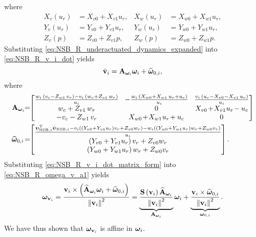 where
\begin{subequations}
    \begin{align}
        X_v(u_r) &= X_{v0} + X_{v1}u_r, &
        X_w(u_r) &= X_{w0} + X_{w1}u_r, \\
        Y_v(u_r) &= Y_{v0} + Y_{v1}u_r, &
        Y_w(u_r) &= Y_{w0} + Y_{w1}u_r, \\
        Z_v(p) &= Z_{v0} + Z_{v1}p, &
        Z_w(p) &= Z_{w0} + Z_{w1}p.
    \end{align}
\end{subequations}
Substituting \eqref{eq:NSB_R_underactuated_dynamics_expanded} into \eqref{eq:NSB_R_v_i_dot} yields
\begin{equation}
    \dot{\mathbf{v}}_i = \mathbf{A}_{\bm{\omega}_i} \bm{\omega}_i + \widehat{\bm{\omega}}_{0, i},
    \label{eq:NSB_R_v_i_dot_matrix_form}
\end{equation}
where
\begin{equation}
    \begin{split}
        \mat{A}_{\bs{\omega}_i\!}\! &=\!\!
        \begin{bmatrix}
            \frac{w_{i}\,\left(v_{c}-Z_{w1}\,v_{r}\right)-v_{i}\,\left(w_{c}+Z_{v1}\,w_{r}\right)}{u_{i}} & 
            \!-\frac{w_{i}\,\left(X_{w0}+X_{w1}\,u_{r}+u_{c}\right)}{u_{i}}\! & 
            \frac{v_{i}\,\left(u_{c}-X_{v0}-X_{v1}\,u_{r}\right)}{u_{i}} \\ 
            w_{c}+Z_{v1}\,w_{r} & 0 & X_{v0\!}+\!X_{v1\!}\,u_{r\!}-u_{c} \\ 
            -v_{c}-Z_{w1}\,v_{r} & \!X_{w0\!}+\!X_{w1\!}\,u_{r\!}+u_{c\!} & 0
        \end{bmatrix} \\
        \widehat{\bs{\omega}}_{0, i}\! &=\!\!
        \begin{bmatrix}
            \frac{\bs{\upsilon}_{{\rm NSB}, i}\T\dot{\bs{\upsilon}}_{{\rm NSB}, i} 
            - v_i\left(\left(Y_{v0} + Y_{v1}u_r\right)v_r + Z_{v0}w_r\right)
            - w_i\left(\left(Y_{w0} + Y_{w1}u_r\right)w_r + Z_{w0}v_r\right)}{u_i} \\
            \left(Y_{v0} + Y_{v1}u_r\right)v_r + Z_{v0}w_r \\
            \left(Y_{w0} + Y_{w1}u_r\right)w_r + Z_{w0}v_r
    \end{bmatrix}.
    \end{split}
\end{equation}
Substituting \eqref{eq:NSB_R_v_i_dot_matrix_form} into \eqref{eq:NSB_R_omega_v_a1} yields
\begin{equation}
    \bm{\omega}_{\mathbf{v}_i} = \frac{\mathbf{v}_i \times \left(\widehat{\mathbf{A}}_{\bm{\omega}_i}\bm{\omega}_i + \widehat{\bm{\omega}}_{0, i}\right)}{\left\|\mathbf{v}_i\right\|^2}
    = \underbrace{\frac{\mathbf{S}\left(\mathbf{v}_i\right)\widehat{\mathbf{A}}_{\bm{\omega}_i}}{\left\|\mathbf{v}_i\right\|^2}}_{\mathbf{A}_{\bm{\omega}_i}}\bm{\omega}_i
     + \underbrace{\frac{\mathbf{v}_i \times \widehat{\bm{\omega}}_{0, i}}{\left\|\mathbf{v}_i\right\|^2}}_{\bm{\omega}_{0, i}}.
     \label{eq:NSB_R_omega_v_affine}
\end{equation}
We have thus shown that $\bm{\omega}_{\mathbf{v}_i}$ is affine in $\bm{\omega}_i$.

